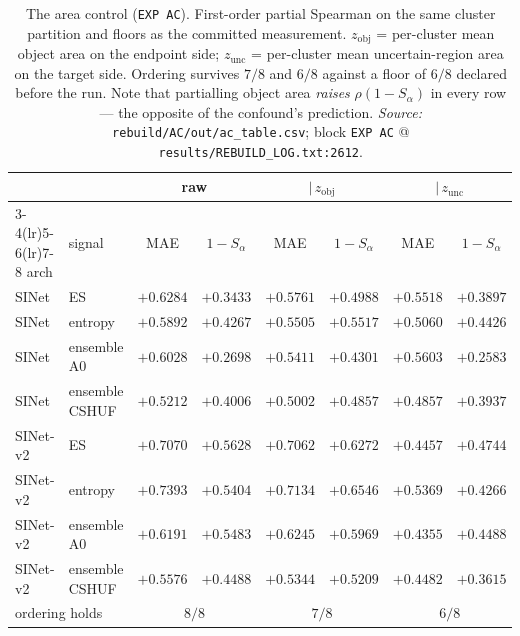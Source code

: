 \begin{table}[h]
\caption{The area control (\texttt{EXP AC}). First-order partial Spearman on the same cluster
partition and floors as the committed measurement. $z_{\mathrm{obj}}$ = per-cluster mean object area
on the endpoint side; $z_{\mathrm{unc}}$ = per-cluster mean uncertain-region area on the target side.
Ordering survives $7/8$ and $6/8$ against a floor of $6/8$ declared before the run. Note that
partialling object area \emph{raises} $\rho(1-S_\alpha)$ in every row --- the opposite of the
confound's prediction. \emph{Source:} \texttt{rebuild/AC/out/ac\_table.csv}; block \texttt{EXP AC} @
\texttt{results/REBUILD\_LOG.txt:2612}.}
\label{tab:areacontrol}
\begin{center}\small
\begin{tabular}{llcccccc}
\toprule
 & & \multicolumn{2}{c}{raw} & \multicolumn{2}{c}{$|\,z_{\mathrm{obj}}$} & \multicolumn{2}{c}{$|\,z_{\mathrm{unc}}$} \\
\cmidrule(lr){3-4}\cmidrule(lr){5-6}\cmidrule(lr){7-8}
arch & signal & MAE & $1-S_\alpha$ & MAE & $1-S_\alpha$ & MAE & $1-S_\alpha$ \\
\midrule
SINet & ES & $+0.6284$ & $+0.3433$ & $+0.5761$ & $+0.4988$ & $+0.5518$ & $+0.3897$ \\
SINet & entropy & $+0.5892$ & $+0.4267$ & $+0.5505$ & $+0.5517$ & $+0.5060$ & $+0.4426$ \\
SINet & ensemble A0 & $+0.6028$ & $+0.2698$ & $+0.5411$ & $+0.4301$ & $+0.5603$ & $+0.2583$ \\
SINet & ensemble CSHUF & $+0.5212$ & $+0.4006$ & $+0.5002$ & $+0.4857$ & $+0.4857$ & $+0.3937$ \\
SINet-v2 & ES & $+0.7070$ & $+0.5628$ & $+0.7062$ & $+0.6272$ & $+0.4457$ & $+0.4744$ \\
SINet-v2 & entropy & $+0.7393$ & $+0.5404$ & $+0.7134$ & $+0.6546$ & $+0.5369$ & $+0.4266$ \\
SINet-v2 & ensemble A0 & $+0.6191$ & $+0.5483$ & $+0.6245$ & $+0.5969$ & $+0.4355$ & $+0.4488$ \\
SINet-v2 & ensemble CSHUF & $+0.5576$ & $+0.4488$ & $+0.5344$ & $+0.5209$ & $+0.4482$ & $+0.3615$ \\
\midrule
\multicolumn{2}{l}{ordering holds} & \multicolumn{2}{c}{$8/8$} & \multicolumn{2}{c}{$7/8$} & \multicolumn{2}{c}{$6/8$} \\
\bottomrule
\end{tabular}
\end{center}
\end{table}

